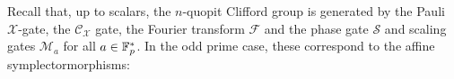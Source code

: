 %
%
%



Recall that, up to scalars, the $n$-quopit Clifford group is generated by the Pauli $\mathcal X$-gate, the $\mathcal{C}_\mathcal{X}$ gate, the Fourier transform $\mathcal F$ and the phase gate $\mathcal S$ and scaling gates $\mathcal{M}_a$ for all $a \in \mathbb{F}_p^*$.
In the odd prime case, these correspond to the affine symplectormorphisms:

